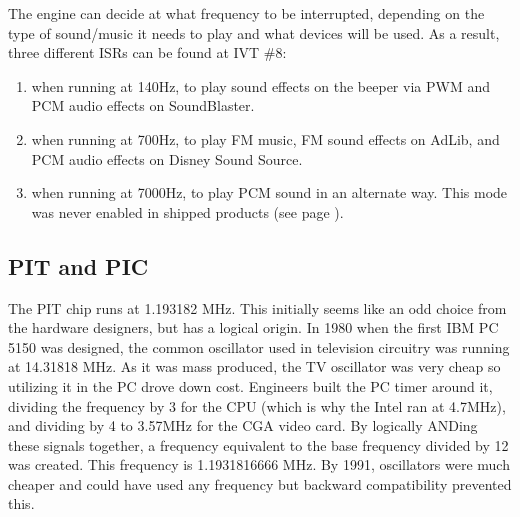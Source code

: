 \par
The engine can decide at what frequency to be interrupted, depending on the type of sound/music it needs to play and what devices will be used. As a result, three different ISRs can be found at IVT \#8: 
\begin{enumerate}
\item {} when running at 140Hz, to play sound effects on the beeper via PWM and PCM audio effects on SoundBlaster.
\item {} when running at 700Hz, to play FM music, FM sound effects on AdLib, and PCM audio effects on Disney Sound Source.
\item {} when running at 7000Hz, to play PCM sound in an alternate way. This mode was never enabled in shipped products (see page \pageref{pcs_pcm}).
\end{enumerate}
\par



\subsection{PIT and PIC}
The PIT chip runs at 1.193182 MHz. This initially seems like an odd choice from the hardware designers, but has a logical origin. In 1980 when the first IBM PC 5150 was designed, the common oscillator used in television circuitry was running at 14.31818 MHz. As it was mass produced, the TV oscillator was very cheap so utilizing it in the PC drove down cost. Engineers built the PC timer around it, dividing the frequency by 3 for the CPU (which is why the Intel ran at 4.7MHz), and dividing by 4 to 3.57MHz for the CGA video card. By logically ANDing these signals together, a frequency equivalent to the base frequency divided by 12 was created. This frequency is 1.1931816666 MHz. By 1991, oscillators were much cheaper and could have used any frequency but backward compatibility prevented this.\\
\par














